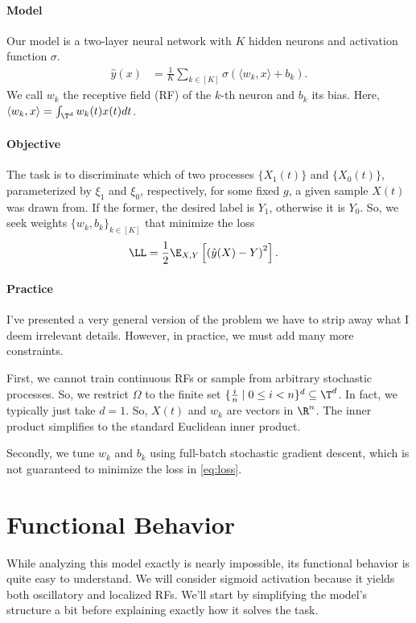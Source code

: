 \documentclass{article}
\begin{document}
\paragraph*{Model}
Our model is a two-layer neural network with $K$ hidden neurons and activation function $\sigma$.
\begin{align}
  \hat{y}(x) &= \frac{1}{K} \sum_{k\in[K]} \sigma( \langle w_k, x \rangle + b_k ).
\end{align}
We call $w_k$ the receptive field (RF) of the $k$-th neuron and $b_k$ its bias.
Here, $\langle w_k, x \rangle = \int_{\T^d} w_k(t) x(t) dt$.

\paragraph*{Objective}
The task is to discriminate which of two processes $\{ X_1(t) \}$ and $\{ X_0(t) \}$, parameterized by $\xi_1$ and $\xi_0$, respectively, for some fixed $g$, a given sample $X(t)$ was drawn from.
If the former, the desired label is $Y_1$, otherwise it is $Y_0$.
So, we seek weights $\{ w_k, b_k \}_{k\in[K]}$ that minimize the loss
\begin{align}
  \LL &= \frac{1}{2} \E_{X,Y} \left[ \left( \hat{y}(X) - Y \right)^2 \right]. \label{eq:loss}
\end{align}

\paragraph*{Practice}
I've presented a very general version of the problem we have to strip away what I deem irrelevant details.
However, in practice, we must add many more constraints.

First, we cannot train continuous RFs or sample from arbitrary stochastic processes.
So, we restrict $\Omega$ to the finite set $\{ \frac{i}{n} \mid 0 \leq i < n \}^d \subseteq \T^d$.
In fact, we typically just take $d=1$.
So, $X(t)$ and $w_k$ are vectors in $\R^n$.
The inner product simplifies to the standard Euclidean inner product.

Secondly, we tune $w_k$ and $b_k$ using full-batch stochastic gradient descent, which is not guaranteed to minimize the loss in \cref{eq:loss}.


\section{Functional Behavior}
While analyzing this model exactly is nearly impossible, its functional behavior is quite easy to understand.
We will consider sigmoid activation because it yields both oscillatory and localized RFs.
We'll start by simplifying the model's structure a bit before explaining exactly how it solves the task.
\end{document}
